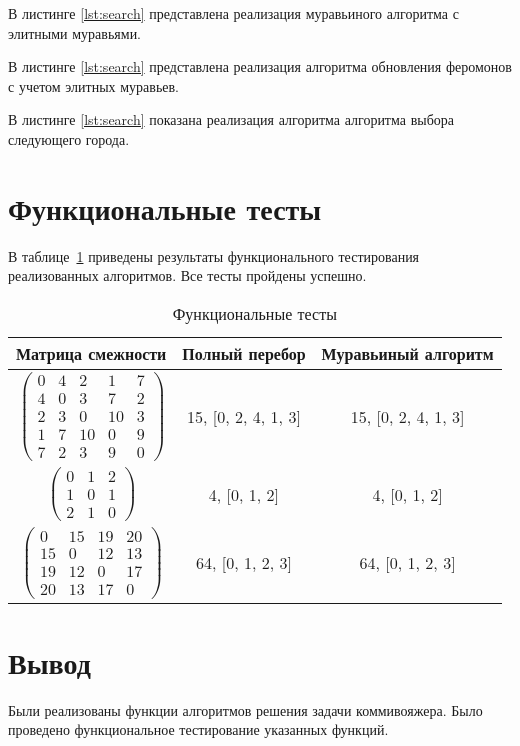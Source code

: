 В листинге \ref{lst:search} представлена реализация муравьиного алгоритма с элитными муравьями.



В листинге \ref{lst:search} представлена реализация алгоритма обновления феромонов с учетом элитных муравьев.



В листинге \ref{lst:search} показана реализация алгоритма алгоритма выбора следующего города.




\section{Функциональные тесты}

В таблице~\ref{tbl:func-tests} приведены результаты функционального тестирования реализованных алгоритмов.
Все тесты пройдены успешно.

\begin{table}[H]
	\caption{Функциональные тесты}
	\label{tbl:func-tests}
	\centering
	\begin{tabular}{|c|c|c|}
		\hline
		Матрица смежности & Полный перебор & Муравьиный алгоритм \\ \hline
		$ \begin{pmatrix}
			0 &  4 &  2 &  1 & 7 \\
			4 &  0 &  3 &  7 & 2 \\
			2 &  3 &  0 & 10 & 3 \\
			1 &  7 & 10 &  0 & 9 \\
			7 &  2 &  3 &  9 & 0
		\end{pmatrix}$ &
		15, [0, 2, 4, 1, 3] &
		15, [0, 2, 4, 1, 3] \\ \hline
		$ \begin{pmatrix}
			0 & 1 & 2 \\
			1 & 0 & 1 \\
			2 & 1 & 0	
		\end{pmatrix}$ &
		4, [0, 1, 2] &
		4, [0, 1, 2] \\ \hline
		$ \begin{pmatrix}
			0 & 15 & 19 & 20 \\
			15 &  0 & 12 & 13 \\
			19 & 12 &  0 & 17 \\
			20 & 13 & 17 &  0
		\end{pmatrix}$ &
		64, [0, 1, 2, 3] &
		64, [0, 1, 2, 3] \\ \hline
	\end{tabular}
\end{table}

\section{Вывод}

Были реализованы функции алгоритмов решения задачи коммивояжера. Было проведено функциональное тестирование указанных функций.
